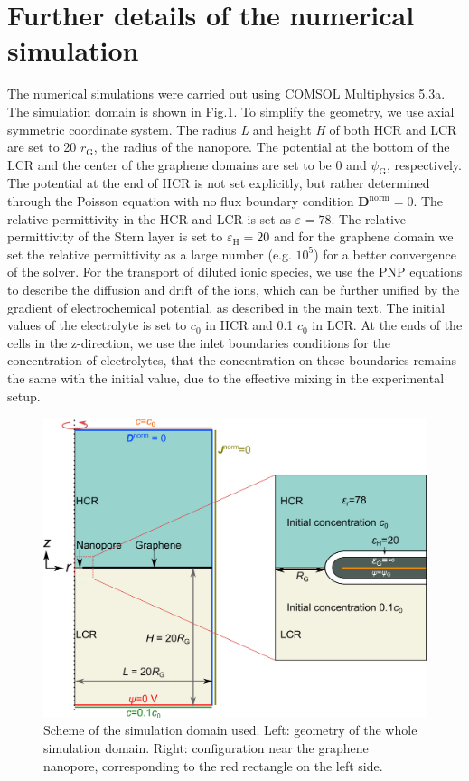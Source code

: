 \documentclass[manuscript=suppinfo,email=true, hyperref=true, keywords=false]{achemso}
\newcommand{\Fig}{Fig.}
\begin{document}
\section{Further details of the numerical simulation }
\label{sec:numer}

The numerical simulations were carried out using COMSOL Multiphysics
5.3a. The simulation domain is shown in \Fig \ref{fig:scheme}. To
simplify the geometry, we use axial symmetric coordinate system. The
radius \textit{L} and height \textit{H} of both HCR and LCR are set to
20 $r_{\mathrm{G}}$, the radius of the nanopore. The potential at the
bottom of the LCR and the center of the graphene domains are set to be
0 and $\psi_{\mathrm{G}}$, respectively. The potential at the end of
HCR is not set explicitly, but rather determined through the Poisson
equation with no flux boundary condition
$\boldsymbol{D}^{\mathrm{norm}}=0$. The relative permittivity in the
HCR and LCR is set as $\varepsilon_{\mathrm{}}=78$. The relative
permittivity of the Stern layer is set to
$\varepsilon_{\mathrm{H}}=20$\cite{Conway_1951} and for the graphene
domain we set the relative permittivity as a large number
(e.g. $10^{5}$) for a better convergence of the solver.  For the
transport of diluted ionic species, we use the PNP equations to
describe the diffusion and drift of the ions, which can be further
unified by the gradient of electrochemical potential, as described in
the main text. The initial values of the electrolyte is set to $c_{0}$
in HCR and 0.1 $c_{0}$ in LCR. At the ends of the cells in the
z-direction, we use the inlet boundaries conditions for the
concentration of electrolytes, that the concentration on these
boundaries remains the same with the initial value, due to the
effective mixing in the experimental setup.

\begin{figure}[htbp]
  \centering
  \includegraphics[width=0.8\linewidth]{img/SI-numerical-1.png}
  \caption{Scheme of the simulation domain used. Left: geometry of the
    whole simulation domain. Right: configuration near the graphene
    nanopore, corresponding to the red rectangle on the left side.}
  \label{fig:scheme}
\end{figure}
\end{document}
